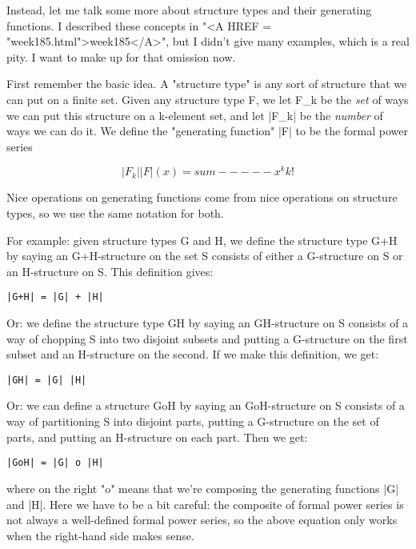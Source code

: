 Instead, let me talk some more about structure types and their generating
functions.  I described these concepts in "<A HREF = "week185.html">week185</A>", but I didn't give
many examples, which is a real pity.  I want to make up for that
omission now.  

First remember the basic idea.  A "structure type" is any sort of
structure that we can put on a finite set.  Given any structure type F,
we let F_{k} be the \emph{set} of ways we can put this structure on a k-element
set, and let |F_{k}| be the \emph{number} of ways we can do it.  We define the 
"generating function" |F| to be the formal power series

$$
               |F_{k}|  
|F|(x) = sum  -----  x^{k}
                k!
$$
    
Nice operations on generating functions come from nice operations on
structure types, so we use the same notation for both.  

For example: given structure types G and H, we define the structure 
type G+H by saying an G+H-structure on the set S consists of either a
G-structure on S or an H-structure on S.  This definition gives:

\begin{verbatim}
|G+H| = |G| + |H| 
\end{verbatim}
    
Or: we define the structure type GH by saying an GH-structure on S
consists of a way of chopping S into two disjoint subsets and putting 
a G-structure on the first subset and an H-structure on the second.  
If we make this definition, we get:

\begin{verbatim}
|GH| = |G| |H|
\end{verbatim}
    
Or: we can define a structure GoH by saying an GoH-structure on S
consists of a way of partitioning S into disjoint parts, putting 
a G-structure on the set of parts, and putting an H-structure on 
each part.  Then we get:

\begin{verbatim}
|GoH| = |G| o |H|
\end{verbatim}
    
where on the right "o" means that we're composing the generating
functions |G| and |H|.  Here we have to be a bit careful: the
composite of formal power series is not always a well-defined 
formal power series, so the above equation only works when the
right-hand side makes sense.

